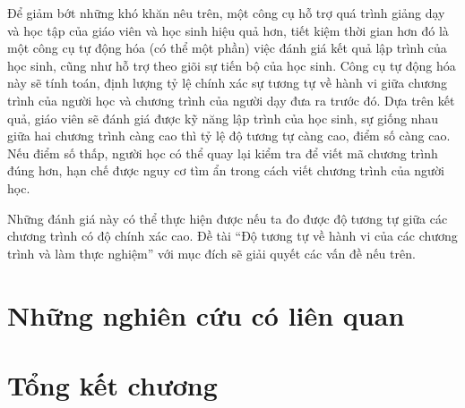 Để giảm bớt những khó khăn nêu trên, một công cụ hỗ trợ quá trình
giảng dạy và học tập của giáo viên và học sinh hiệu quả hơn, tiết kiệm
thời gian hơn đó là một công cụ tự động hóa (có thể một phần) việc
đánh giá kết quả lập trình của học sinh, cũng như hỗ trợ theo giõi sự
tiến bộ của học sinh. Công cụ tự động hóa này sẽ tính toán, định lượng
tỷ lệ chính xác sự tương tự về hành vi giữa chương trình của người học
và chương trình của người dạy đưa ra trước đó. Dựa trên kết quả, giáo
viên sẽ đánh giá được kỹ năng lập trình của học sinh, sự giống nhau
giữa hai chương trình càng cao thì tỷ lệ độ tương tự càng cao, điểm số
càng cao. Nếu điểm số thấp, người học có thể quay lại kiểm tra để viết
mã chương trình đúng hơn, hạn chế được nguy cơ tìm ẩn trong cách viết
chương trình của người học.
	
Những đánh giá này có thể thực hiện được nếu ta đo được độ tương tự
giữa các chương trình có độ chính xác cao. Đề tài “Độ tương tự về hành
vi của các chương trình và làm thực nghiệm” với mục đích sẽ giải quyết
các vấn đề nếu trên.

\section{Những nghiên cứu có liên quan}



\section*{Tổng kết chương}



